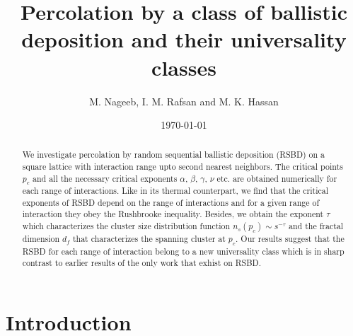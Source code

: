 ﻿\documentclass[twocolumn,showpacs,preprintnumbers,amsmath,amssymb]{revtex4}
\begin{document}
\title{Percolation by a class of ballistic deposition and their universality classes 
}%

\author{M. Nageeb, I. M. Rafsan and M. K. Hassan}%
\date{\today}%


\begin{abstract}
We investigate percolation by random sequential ballistic deposition (RSBD) on a square lattice 
with interaction range upto second nearest neighbors. The critical points $p_c$ and 
all the necessary critical exponents $\alpha$, $\beta$, $\gamma$, $\nu$ etc. are obtained numerically for 
each range of interactions. Like  in its thermal counterpart, we find that the critical exponents 
of RSBD depend on the range of interactions and for a given range of interaction they obey the Rushbrooke inequality. 
Besides, we obtain the exponent $\tau$ which characterizes the cluster size distribution  
function $n_s(p_c)\sim s^{-\tau}$ and the fractal dimension $d_f$ that characterizes 
the spanning cluster at $p_c$. Our results suggest that the RSBD for each range of interaction
belong to a new universality class which is in sharp contrast to earlier results of the only work that exhist 
on RSBD.
\end{abstract}


\maketitle

\section{Introduction}
\end{document}
